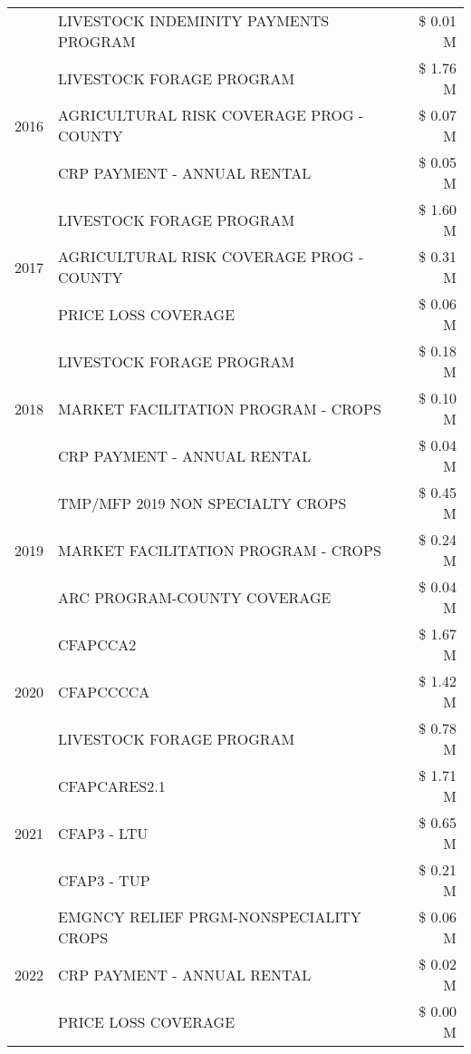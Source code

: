 \begin{tabular}{llr}
 & LIVESTOCK INDEMINITY PAYMENTS PROGRAM & \$ 0.01 M \\
\cline{1-3}
\multirow[t]{3}{*}{2016} & LIVESTOCK FORAGE PROGRAM & \$ 1.76 M \\
 & AGRICULTURAL RISK COVERAGE PROG - COUNTY & \$ 0.07 M \\
 & CRP PAYMENT - ANNUAL RENTAL & \$ 0.05 M \\
\cline{1-3}
\multirow[t]{3}{*}{2017} & LIVESTOCK FORAGE PROGRAM & \$ 1.60 M \\
 & AGRICULTURAL RISK COVERAGE PROG - COUNTY & \$ 0.31 M \\
 & PRICE LOSS COVERAGE & \$ 0.06 M \\
\cline{1-3}
\multirow[t]{3}{*}{2018} & LIVESTOCK FORAGE PROGRAM & \$ 0.18 M \\
 & MARKET FACILITATION PROGRAM - CROPS & \$ 0.10 M \\
 & CRP PAYMENT - ANNUAL RENTAL & \$ 0.04 M \\
\cline{1-3}
\multirow[t]{3}{*}{2019} & TMP/MFP 2019 NON SPECIALTY CROPS & \$ 0.45 M \\
 & MARKET FACILITATION PROGRAM - CROPS & \$ 0.24 M \\
 & ARC PROGRAM-COUNTY COVERAGE & \$ 0.04 M \\
\cline{1-3}
\multirow[t]{3}{*}{2020} & CFAPCCA2 & \$ 1.67 M \\
 & CFAPCCCCA & \$ 1.42 M \\
 & LIVESTOCK FORAGE PROGRAM & \$ 0.78 M \\
\cline{1-3}
\multirow[t]{3}{*}{2021} & CFAPCARES2.1 & \$ 1.71 M \\
 & CFAP3 - LTU & \$ 0.65 M \\
 & CFAP3 - TUP & \$ 0.21 M \\
\cline{1-3}
\multirow[t]{3}{*}{2022} & EMGNCY RELIEF PRGM-NONSPECIALITY CROPS & \$ 0.06 M \\
 & CRP PAYMENT - ANNUAL RENTAL & \$ 0.02 M \\
 & PRICE LOSS COVERAGE & \$ 0.00 M \\
\cline{1-3}
\bottomrule
\end{tabular}
